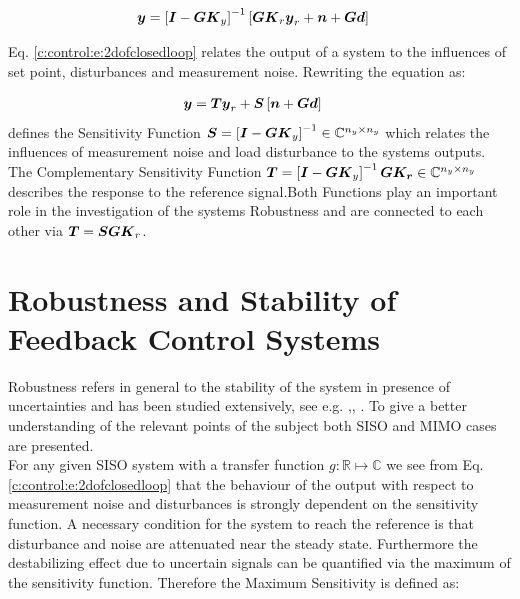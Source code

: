 \begin{align}
\begin{split}
\mbox{\boldmath$y$} &= \left[\mbox{\boldmath$I$} - \mbox{\boldmath$G$} \mbox{\boldmath$K$}_y\right]^{-1} \left[ \mbox{\boldmath$G$}\mbox{\boldmath$K$}_r \mbox{\boldmath$y$}_r + \mbox{\boldmath$n$} + \mbox{\boldmath$G$} \mbox{\boldmath$d$} \right]
\end{split}
\label{c:control:e:2dofclosedloop}
\end{align}

Eq. \ref{c:control:e:2dofclosedloop} relates the output of a system to the influences of set point, disturbances and measurement noise. 
Rewriting the equation as:

\begin{align}
\begin{split}
\mbox{\boldmath$y$} &= \mbox{\boldmath$T$}\mbox{\boldmath$y$}_r + \mbox{\boldmath$S$} \left[ \mbox{\boldmath$n$} + \mbox{\boldmath$G$} \mbox{\boldmath$d$} \right]
\end{split}
\label{c:control:e:sensitivityclosedloop}
\end{align}
defines the Sensitivity Function $\mbox{\boldmath$S$} = \left[ \mbox{\boldmath$I$} - \mbox{\boldmath$G$} \mbox{\boldmath$K$}_y\right]^{-1} \in \mathbb{C}^{n_y \times n_y}$ which relates the influences of measurement noise and load disturbance to the systems outputs. The Complementary Sensitivity Function $\mbox{\boldmath$T$} = \left[\mbox{\boldmath$I$} - \mbox{\boldmath$G$} \mbox{\boldmath$K$}_y\right]^{-1} \mbox{\boldmath$G$} \mbox{\boldmath$K_r$} \in \mathbb{C}^{n_y \times n_y}$ describes the response to the reference signal.Both Functions play an important role in the investigation of the systems Robustness and are connected to each other via $\mbox{\boldmath$T$} = \mbox{\boldmath$S$} \mbox{\boldmath$G$} \mbox{\boldmath$K$}_r$.\\

\section{Robustness and Stability of Feedback Control Systems}

Robustness refers in general to the stability of the system in presence of uncertainties and has been studied extensively, see e.g. \cite{Zhou1998},\cite{Zhou1996}, \cite{DoyleFeedbackTheory}.
To give a better understanding of the relevant points of the subject both SISO and MIMO cases are presented. \\

For any given SISO system with a transfer function $g : \mathbb{R} \mapsto \mathbb{C}$ we see from Eq. \ref{c:control:e:2dofclosedloop} that the behaviour of the output with respect to measurement noise and disturbances is strongly dependent on the sensitivity function. A necessary condition for the system to reach the reference is that disturbance and noise are attenuated  near the steady state. Furthermore the destabilizing effect due to uncertain signals can be quantified via the maximum of the sensitivity function. Therefore the Maximum Sensitivity is defined as:

